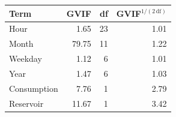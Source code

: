 \begin{tabular}{lrrr}
\toprule
Term & GVIF & df & GVIF$^{1/(2\,\mathrm{df})}$ \\
\midrule
Hour & 1.65 & 23 & 1.01 \\
Month & 79.75 & 11 & 1.22 \\
Weekday & 1.12 &  6 & 1.01 \\
Year & 1.47 &  6 & 1.03 \\
Consumption & 7.76 &  1 & 2.79 \\
Reservoir & 11.67 &  1 & 3.42 \\
\bottomrule
\end{tabular}
